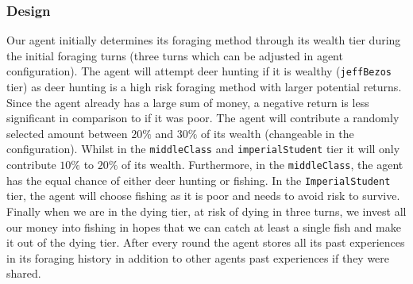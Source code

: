 \subsubsection{Design}
Our agent initially determines its foraging method through its wealth tier during the initial foraging turns (three turns which can be adjusted in agent configuration). The agent will attempt deer hunting if it is wealthy (\texttt{jeffBezos} tier) as deer hunting is a high risk foraging method with larger potential returns. Since the agent already has a large sum of money, a negative return is less significant in comparison to if it was poor. The agent will contribute a randomly selected amount between $20\%$ and $30\%$ of its wealth (changeable in the configuration). Whilst in the \texttt{middleClass} and \texttt{imperialStudent} tier it will only contribute $10\%$ to $20\%$ of its wealth. Furthermore, in the \texttt{middleClass}, the agent has the equal chance of either deer hunting or fishing. In the \texttt{ImperialStudent} tier, the agent will choose fishing as it is poor and needs to avoid risk to survive. Finally when we are in the dying tier, at risk of dying in three turns, we invest all our money into fishing in hopes that we can catch at least a single fish and make it out of the dying tier. After every round the agent stores all its past experiences in its foraging history in addition to other agents past experiences if they were shared.  

